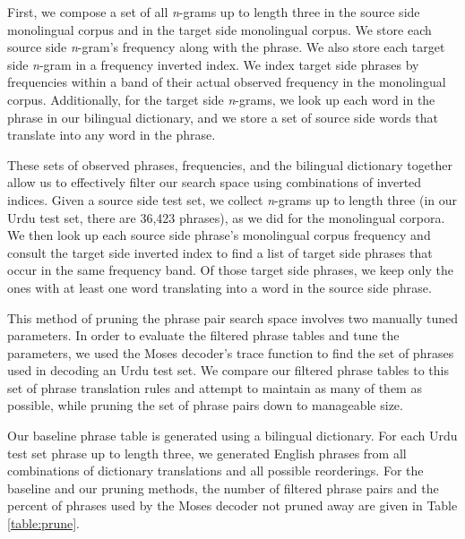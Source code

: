 \documentclass[11pt]{article}
\newcommand{\mnote}[1]{\marginpar{%
  \vskip-\baselineskip
  \raggedright\footnotesize
  \itshape\hrule\smallskip\tiny{#1}\par\smallskip\hrule}}
\newcommand{\mtodo}[1]{\mnote{\textcolor{red}{#1}}}
\begin{document}
First, we compose a set of all {\it n}-grams up to length three in the source side monolingual corpus and in the target side monolingual corpus. We store each source side {\it n}-gram's frequency along with the phrase. We also store each target side {\it n}-gram in a frequency inverted index. We index target side phrases by frequencies within a band of their actual observed frequency in the monolingual corpus. Additionally, for the target side {\it n}-grams, we look up each word in the phrase in our bilingual dictionary, and we store a set of source side words that translate into any word in the phrase. \mtodo{discuss dictionary(ies)}

These sets of observed phrases, frequencies, and the bilingual dictionary together allow us to effectively filter our search space using combinations of inverted indices. Given a source side test set, we collect  {\it n}-grams up to length three (in our Urdu test set, there are 36,423 phrases), as we did for the monolingual corpora. We then look up each source side phrase's monolingual corpus frequency and consult the target side inverted index to find a list of target side phrases that occur in the same frequency band. Of those target side phrases, we keep only the ones with at least one \mtodo{discuss dictionary parameters} word translating into a word in the source side phrase. 

This method of pruning the phrase pair search space involves two manually tuned parameters. In order to evaluate the filtered phrase tables and tune the parameters, we used the Moses decoder's trace function to find the set of phrases used in decoding an Urdu test set. \mtodo{data details?} We compare our filtered phrase tables to this set of phrase translation rules and attempt to maintain as many of them as possible, while pruning the set of phrase pairs down to manageable size. 

Our baseline phrase table is generated using a bilingual dictionary. For each Urdu test set phrase up to length three, we generated English phrases from all combinations of dictionary translations and all possible reorderings. For the baseline and our pruning methods, the number of filtered phrase pairs and the percent of phrases used by the Moses decoder not pruned away are given in Table \ref{table:prune}.  
\end{document}
